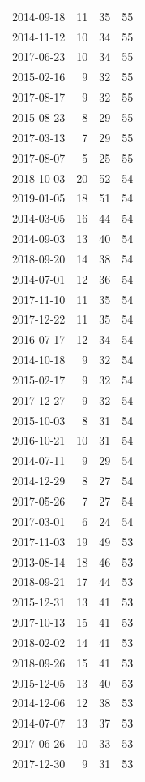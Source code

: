 \begin{tabular}{lrrr}
2014-09-18 & 11 & 35 & 55 \\
2014-11-12 & 10 & 34 & 55 \\
2017-06-23 & 10 & 34 & 55 \\
2015-02-16 & 9 & 32 & 55 \\
2017-08-17 & 9 & 32 & 55 \\
2015-08-23 & 8 & 29 & 55 \\
2017-03-13 & 7 & 29 & 55 \\
2017-08-07 & 5 & 25 & 55 \\
2018-10-03 & 20 & 52 & 54 \\
2019-01-05 & 18 & 51 & 54 \\
2014-03-05 & 16 & 44 & 54 \\
2014-09-03 & 13 & 40 & 54 \\
2018-09-20 & 14 & 38 & 54 \\
2014-07-01 & 12 & 36 & 54 \\
2017-11-10 & 11 & 35 & 54 \\
2017-12-22 & 11 & 35 & 54 \\
2016-07-17 & 12 & 34 & 54 \\
2014-10-18 & 9 & 32 & 54 \\
2015-02-17 & 9 & 32 & 54 \\
2017-12-27 & 9 & 32 & 54 \\
2015-10-03 & 8 & 31 & 54 \\
2016-10-21 & 10 & 31 & 54 \\
2014-07-11 & 9 & 29 & 54 \\
2014-12-29 & 8 & 27 & 54 \\
2017-05-26 & 7 & 27 & 54 \\
2017-03-01 & 6 & 24 & 54 \\
2017-11-03 & 19 & 49 & 53 \\
2013-08-14 & 18 & 46 & 53 \\
2018-09-21 & 17 & 44 & 53 \\
2015-12-31 & 13 & 41 & 53 \\
2017-10-13 & 15 & 41 & 53 \\
2018-02-02 & 14 & 41 & 53 \\
2018-09-26 & 15 & 41 & 53 \\
2015-12-05 & 13 & 40 & 53 \\
2014-12-06 & 12 & 38 & 53 \\
2014-07-07 & 13 & 37 & 53 \\
2017-06-26 & 10 & 33 & 53 \\
2017-12-30 & 9 & 31 & 53 \\

\end{tabular}
